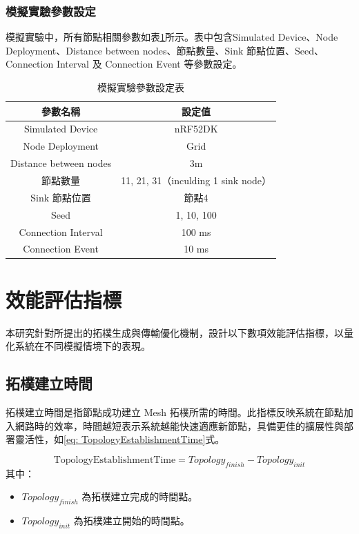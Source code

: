 \begin{ZhChapter}
\subsubsection{模擬實驗參數設定}
模擬實驗中，所有節點相關參數如表\ref{tab: 模擬實驗參數設定表}所示。表中包含Simulated Device、Node Deployment、Distance between nodes、節點數量、Sink 節點位置、Seed、Connection Interval 及 Connection Event 等參數設定。

\begin{table}[H]
    \centering
    \caption{模擬實驗參數設定表}
    \label{tab: 模擬實驗參數設定表}
    \begin{tabular}{|c|c|}
        \hline
        參數名稱 & 設定值 \\
        \hline
        Simulated Device & nRF52DK \\
        \hline
        Node Deployment & Grid \\
        \hline
        Distance between nodes & 3m \\
        \hline
        節點數量 & 11, 21, 31（inculding 1 sink node） \\
        \hline
        Sink 節點位置 & 節點4 \\
        \hline
        Seed & 1, 10, 100 \\
        \hline
        Connection Interval & 100 ms \\
        \hline
        Connection Event &  10 ms  \\
        \hline
    \end{tabular}
\end{table}

\section{效能評估指標}
本研究針對所提出的拓樸生成與傳輸優化機制，設計以下數項效能評估指標，以量化系統在不同模擬情境下的表現。

\subsection{拓樸建立時間}
拓樸建立時間是指節點成功建立 Mesh 拓樸所需的時間。此指標反映系統在節點加入網路時的效率，時間越短表示系統越能快速適應新節點，具備更佳的擴展性與部署靈活性，如\ref{eq: TopologyEstablishmentTime}式。

\begin{equation}
\label{eq: TopologyEstablishmentTime}
\text{TopologyEstablishmentTime} = Topology_{finish} - Topology_{init}
\end{equation}
其中：
\begin{itemize}
    \item $Topology_{finish}$ 為拓樸建立完成的時間點。
    \item $Topology_{init}$ 為拓樸建立開始的時間點。
\end{itemize}


\end{ZhChapter}
